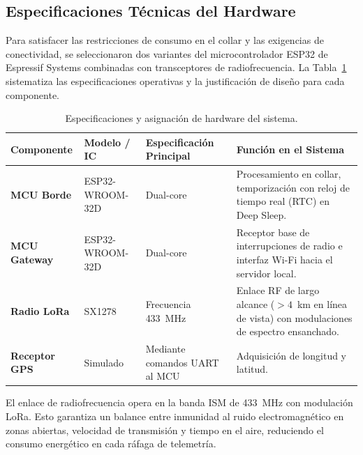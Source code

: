 \subsection{Especificaciones Técnicas del Hardware}

Para satisfacer las restricciones de consumo en el collar y las exigencias de conectividad, se seleccionaron dos variantes del microcontrolador ESP32 de Espressif Systems combinadas con transceptores de radiofrecuencia. La Tabla~\ref{tab:hardware_specs} sistematiza las especificaciones operativas y la justificación de diseño para cada componente.

\begin{table}[H]
\centering
\small
\begin{tabularx}{\textwidth}{@{}l l l X@{}}
\toprule
\textbf{Componente} & \textbf{Modelo / IC} & \textbf{Especificación Principal} & \textbf{Función en el Sistema} \\ \midrule
\textbf{MCU Borde} & ESP32-WROOM-32D & Dual-core & Procesamiento en collar, temporización con reloj de tiempo real (RTC) en Deep Sleep. \\ \addlinespace
\textbf{MCU Gateway} & ESP32-WROOM-32D & Dual-core & Receptor base de interrupciones de radio e interfaz Wi-Fi hacia el servidor local. \\ \addlinespace
\textbf{Radio LoRa} & SX1278 & Frecuencia 433~MHz & Enlace RF de largo alcance ($>4$~km en línea de vista) con modulaciones de espectro ensanchado. \\ \addlinespace
\textbf{Receptor GPS} & Simulado & Mediante comandos UART al MCU & Adquisición de longitud y latitud. \\ \bottomrule
\end{tabularx}
\caption{Especificaciones y asignación de hardware del sistema.}
\label{tab:hardware_specs}
\end{table}

El enlace de radiofrecuencia opera en la banda ISM de 433~MHz con modulación LoRa. Esto garantiza un balance entre inmunidad al ruido electromagnético en zonas abiertas, velocidad de transmisión y tiempo en el aire, reduciendo el consumo energético en cada ráfaga de telemetría.
